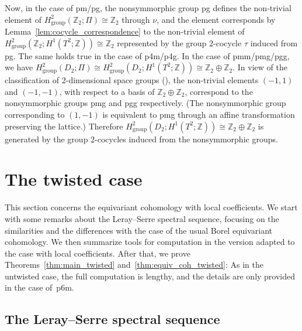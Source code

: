 \documentclass[pdftex]{sigma}
\theoremstyle{definition}
\newcommand{\Z}{\mathbb{Z}}
\begin{document}
Now, in the case of \textsf{pm/pg}, the nonsymmorphic group \textsf{pg} def\/ines the non-trivial element of $H^2_{\mathrm{group}}(\Z_2; \Pi) \cong \Z_2$ through $\nu$, and the element corresponds by Lemma~\ref{lem:cocycle_correspondence} to the non-trivial element of $H^2_{\mathrm{group}}(\Z_2; H^1(T^2; \Z)) \cong \Z_2$ represented by the group $2$-cocycle $\tau$ induced from \textsf{pg}. The same holds true in the case of \textsf{p4m/p4g}. In the case of \textsf{pmm/pmg/pgg}, we have $H^2_{\mathrm{group}}(D_2; \Pi) \cong H^2_{\mathrm{group}}(D_2; H^1(T^2; \Z)) \cong \Z_2 \oplus \Z_2$. In view of the classif\/ication of $2$-dimensional space groups (\cite{H}), the non-trivial elements $(-1, 1)$ and $(-1, -1)$, with respect to a basis of $\Z_2 \oplus \Z_2$, correspond to the nonsymmorphic groups \textsf{pmg} and \textsf{pgg} respectively. (The nonsymmorphic group corresponding to $(1, -1)$ is equivalent to \textsf{pmg} through an af\/f\/ine transformation preserving the lattice.) Therefore $H^2_{\mathrm{group}}(D_2; H^1(T^2; \Z)) \cong \Z_2 \oplus \Z_2$ is generated by the group $2$-cocycles induced from the nonsymmorphic groups.

\section{The twisted case}\label{sec:twisted_case}

This section concerns the equivariant cohomology with local coef\/f\/icients. We start with some remarks about the Leray--Serre spectral sequence, focusing on the similarities and the dif\/ferences with the case of the usual Borel equivariant cohomology. We then summarize tools for computation in the version adapted to the case with local coef\/f\/icients. After that, we prove Theo\-rems~\ref{thm:main_twisted} and~\ref{thm:equiv_coh_twisted}: As in the untwisted case, the full computation is lengthy, and the details are only provided in the case of~\textsf{p6m}.

\subsection{The Leray--Serre spectral sequence}
\end{document}
